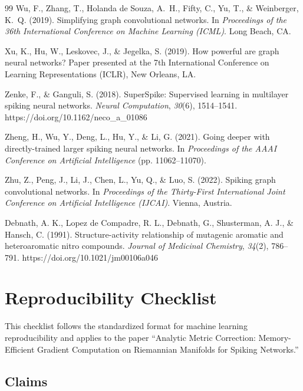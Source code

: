 \documentclass[a4paper,fleqn]{cas-dc}
\begin{document}
\begin{thebibliography}{99}
Wu, F., Zhang, T., Holanda de Souza, A.~H., Fifty, C., Yu, T., \& Weinberger, K.~Q. (2019). Simplifying graph convolutional networks. In \textit{Proceedings of the 36th International Conference on Machine Learning (ICML)}. Long Beach, CA.

Xu, K., Hu, W., Leskovec, J., \& Jegelka, S. (2019). How powerful are graph neural networks? Paper presented at the 7th International Conference on Learning Representations (ICLR), New Orleans, LA.

Zenke, F., \& Ganguli, S. (2018). SuperSpike: Supervised learning in multilayer spiking neural networks. \textit{Neural Computation}, \textit{30}(6), 1514--1541. https://doi.org/10.1162/neco\_a\_01086

Zheng, H., Wu, Y., Deng, L., Hu, Y., \& Li, G. (2021). Going deeper with directly-trained larger spiking neural networks. In \textit{Proceedings of the AAAI Conference on Artificial Intelligence} (pp. 11062--11070).

Zhu, Z., Peng, J., Li, J., Chen, L., Yu, Q., \& Luo, S. (2022). Spiking graph convolutional networks. In \textit{Proceedings of the Thirty-First International Joint Conference on Artificial Intelligence (IJCAI)}. Vienna, Austria.

Debnath, A. K., Lopez de Compadre, R. L., Debnath, G., Shusterman, A. J., \& Hansch, C. (1991). Structure-activity relationship of mutagenic aromatic and heteroaromatic nitro compounds. \textit{Journal of Medicinal Chemistry}, \textit{34}(2), 786--791. https://doi.org/10.1021/jm00106a046



\end{thebibliography}

\section{Reproducibility Checklist}
\label{sec:checklist}

This checklist follows the standardized format for machine learning reproducibility and applies to the paper ``Analytic Metric Correction: Memory-Efficient Gradient Computation on Riemannian Manifolds for Spiking Networks.''

\subsection*{Claims}
\end{document}
